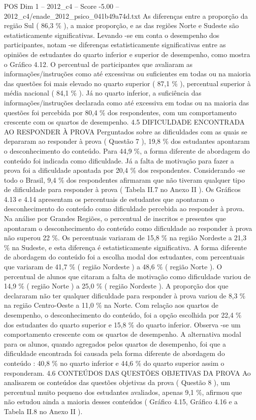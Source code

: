 \begin{textsample}{POS Dim 1 – 2012\_c4 – Score -5.00 – 2012\_c4/enade\_2012\_psico\_041b49a74d.txt}
As diferenças entre a proporção da região Sul ( 86,3 \% ), a maior proporção, e as das regiões Norte e Sudeste são estatisticamente significativas.
Levando -se em conta o desempenho dos participantes, notam -se diferenças estatisticamente significativas entre as opiniões de estudantes do quarto inferior e superior de desempenho, como mostra o Gráfico 4.12.
O percentual de participantes que avaliaram as informações/instruções como até excessivas ou suficientes em todas ou na maioria das questões foi mais elevado no quarto superior ( 87,1 \% ), percentual superior à média nacional ( 84,1 \% ).
Já no quarto inferior, a suficiência das informações/instruções declarada como até excessiva em todas ou na maioria das questões foi percebida por 80,4 \% dos respondentes, com um comportamento crescente com os quartos de desempenho. 4.5 DIFICULDADE ENCONTRADA AO RESPONDER À PROVA Perguntados sobre as dificuldades com as quais se depararam ao responder à prova ( Questão 7 ), 19,8 \% dos estudantes apontaram o desconhecimento do conteúdo.
Para 44,9 \%, a forma diferente de abordagem do conteúdo foi indicada como dificuldade.
Já a falta de motivação para fazer a prova foi a dificuldade apontada por 20,4 \% dos respondentes.
Considerando -se todo o Brasil, 9,4 \% dos respondentes afirmaram que não tiveram qualquer tipo de dificuldade para responder à prova ( Tabela II.7 no Anexo II ).
Os Gráficos 4.13 e 4.14 apresentam os percentuais de estudantes que apontaram o desconhecimento do conteúdo como dificuldade percebida ao responder à prova.
Na análise por Grandes Regiões, o percentual de inscritos e presentes que apontaram o desconhecimento do conteúdo como dificuldade ao responder à prova não superou 22 \%.
Os percentuais variaram de 15,8 \% na região Nordeste a 21,3 \% na Sudeste, e esta diferença é estatisticamente significativa.
A forma diferente de abordagem do conteúdo foi a escolha modal dos estudantes, com percentuais que variaram de 41,7 \% ( região Nordeste ) a 48,6 \% ( região Norte ).
O percentual de alunos que citaram a falta de motivação como dificuldade variou de 14,9 \% ( região Norte ) a 25,0 \% ( região Nordeste ).
A proporção dos que declararam não ter qualquer dificuldade para responder à prova variou de 8,3 \% na região Centro-Oeste a 11,0 \% na Norte.
Com relação aos quartos de desempenho, o desconhecimento do conteúdo, foi a opção escolhida por 22,4 \% dos estudantes do quarto superior e 15,8 \% do quarto inferior.
Observa -se um comportamento crescente com os quartos de desempenho.
A alternativa modal para os alunos, quando agregados pelos quartos de desempenho, foi que a dificuldade encontrada foi causada pela forma diferente de abordagem do conteúdo : 40,8 \% no quarto inferior e 44,6 \% do quarto superior assim o responderam. 4.6 CONTEÚDOS DAS QUESTÕES OBJETIVAS DA PROVA Ao analisarem os conteúdos das questões objetivas da prova ( Questão 8 ), um percentual muito pequeno dos estudantes avaliados, apenas 9,1 \%, afirmou que não estudou ainda a maioria desses conteúdos ( Gráfico 4.15, Gráfico 4.16 e a Tabela II.8 no Anexo II ).

\end{textsample}
